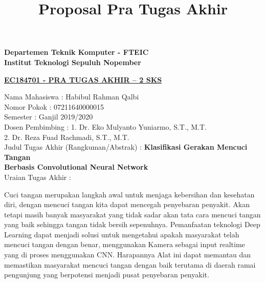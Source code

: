 \documentclass[a4paper]{article}
\title{Proposal Pra Tugas Akhir}
\begin{document}
	
	\begin{flushleft}
		\textbf{Departemen Teknik Komputer - FTEIC}\\
		\textbf{Institut Teknologi Sepuluh Nopember}\\
	\end{flushleft}

	\begin{center}
		\underline{\textbf{EC184701 - PRA TUGAS AKHIR – 2 SKS}}
	\end{center}

	\begin{flushleft}
		Nama Mahasiswa \tab : Habibul Rahman Qalbi\\
		Nomor Pokok \tab : 07211640000015 \\
		Semester \tab : Ganjil 2019/2020\\
		Dosen Pembimbing \tab : 1. Dr. Eko Mulyanto Yuniarmo, S.T., M.T.\\
		\tab \hspace{1mm} 2. Dr. Reza Fuad Rachmadi, S.T., M.T.\\
		Judul Tugas Akhir (Rangkuman/Abstrak) \tab : \textbf{Klasifikasi Gerakan Mencuci Tangan\\
		\tab \hspace{1mm} Berbasis Convolutional Neural Network}\\
		Uraian Tugas Akhir \tab :\\
	\end{flushleft}
		\vspace{-3mm}Cuci tangan merupakan langkah awal untuk menjaga kebersihan dan kesehatan diri, dengan mencuci tangan kita dapat mencegah penyebaran penyakit. Akan tetapi masih banyak masyarakat yang tidak sadar akan tata cara mencuci tangan yang baik sehingga tangan tidak bersih sepenuhnya. Pemanfaatan teknologi Deep Learning dapat menjadi solusi untuk mengetahui apakah masyarakat telah mencuci tangan dengan benar, menggunakan Kamera sebagai input realtime yang di proses menggunakan CNN. Harapannya Alat ini dapat memantau dan memastikan masyarakat mencuci tangan dengan baik terutama di daerah ramai pengunjung yang berpotensi menjadi pusat penyebaran penyakit.
	\vspace{1cm}
	
\end{document}
